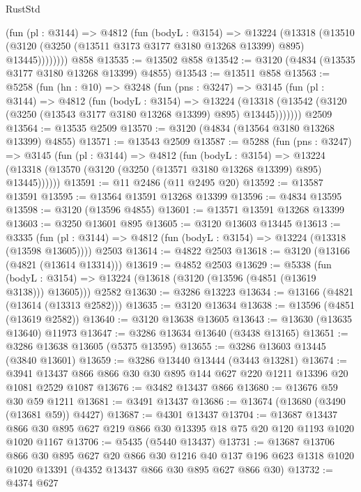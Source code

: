 \begin{lexlean}{RustStd}
\begin{coremodule}
          (fun (pl : @3144) =>
          @4812
            (fun (bodyL : @3154) =>
            @13224
              (@13318
                (@13510 (@3120 (@3250 (@13511 @3173 @3177 @3180 @13268 @13399) @895) @13445))))))))
    @858
@13535 := @13502 @858
@13542 := @3120 (@4834 (@13535 @3177 @3180 @13268 @13399) @4855)
@13543 := @13511 @858
@13563 := @5258
    (fun (hn : @10) =>
    @3248
      (fun (pns : @3247) =>
      @3145
        (fun (pl : @3144) =>
        @4812
          (fun (bodyL : @3154) =>
          @13224
            (@13318 (@13542 (@3120 (@3250 (@13543 @3177 @3180 @13268 @13399) @895) @13445)))))))
    @2509
@13564 := @13535 @2509
@13570 := @3120 (@4834 (@13564 @3180 @13268 @13399) @4855)
@13571 := @13543 @2509
@13587 := @5288
    (fun (pns : @3247) =>
    @3145
      (fun (pl : @3144) =>
      @4812
        (fun (bodyL : @3154) =>
        @13224 (@13318 (@13570 (@3120 (@3250 (@13571 @3180 @13268 @13399) @895) @13445))))))
@13591 := @11 @2486 (@11 @2495 @20)
@13592 := @13587 @13591
@13595 := @13564 @13591 @13268 @13399
@13596 := @4834 @13595
@13598 := @3120 (@13596 @4855)
@13601 := @13571 @13591 @13268 @13399
@13603 := @3250 @13601 @895
@13605 := @3120 @13603 @13445
@13613 := @3335
    (fun (pl : @3144) => @4812 (fun (bodyL : @3154) => @13224 (@13318 (@13598 @13605))))
    @2503
@13614 := @4822 @2503
@13618 := @3120 (@13166 (@4821 (@13614 @13314)))
@13619 := @4852 @2503
@13629 := @5338
    (fun (bodyL : @3154) => @13224 (@13618 (@3120 (@13596 (@4851 (@13619 @3138))) @13605)))
    @2582
@13630 := @3286 @13223
@13634 := @13166 (@4821 (@13614 (@13313 @2582)))
@13635 := @3120 @13634
@13638 := @13596 (@4851 (@13619 @2582))
@13640 := @3120 @13638 @13605
@13643 := @13630 (@13635 @13640) @11973
@13647 := @3286 @13634 @13640 (@3438 @13165)
@13651 := @3286 @13638 @13605 (@5375 @13595)
@13655 := @3286 @13603 @13445 (@3840 @13601)
@13659 := @3286 @13440 @13444 (@3443 @13281)
@13674 := @3941 @13437 @866 @866 @30 @30 @895 @144 @627 @220 @1211 @13396 @20 @1081 @2529 @1087
@13676 := @3482 @13437 @866
@13680 := @13676 @59 @30 @59 @1211
@13681 := @3491 @13437
@13686 := @13674 (@13680 (@3490 (@13681 @59)) @4427)
@13687 := @4301 @13437
@13704 := @13687
    @13437
    @866
    @30
    @895
    @627
    @219
    @866
    @30
    @13395
    @18
    @75
    @20
    @120
    @1193
    @1020
    @1020
    @1167
@13706 := @5435 (@5440 @13437)
@13731 := @13687
    @13706
    @866
    @30
    @895
    @627
    @20
    @866
    @30
    @1216
    @40
    @137
    @196
    @623
    @1318
    @1020
    @1020
    @13391
    (@4352 @13437 @866 @30 @895 @627 @866 @30)
@13732 := @4374 @627

\end{coremodule}
\end{lexlean}
